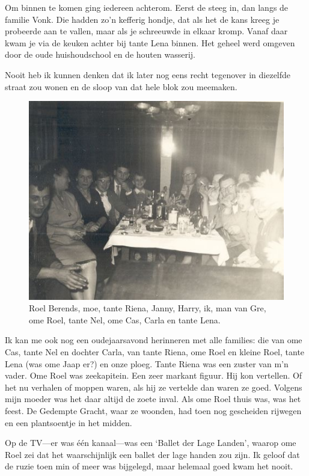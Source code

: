 \documentclass[12pt,twoside]{memoir}
\begin{document}
Om binnen te komen ging iedereen achterom. Eerst de steeg in, dan langs de familie Vonk. Die hadden zo’n kefferig hondje, dat als het de kans kreeg je probeerde aan te vallen, maar als je schreeuwde in elkaar kromp. Vanaf daar kwam je via de keuken achter bij tante Lena binnen. Het geheel werd omgeven door de oude huishoudschool en de houten wasserij.  

Nooit heb ik kunnen denken dat ik later nog eens recht tegenover in diezelfde straat zou wonen en de sloop van dat hele blok zou meemaken.

\begin{figure}[h]
\includegraphics[width=\textwidth]{img/ch1-afb03}
\caption{Roel Berends, moe, tante Riena, Janny, Harry, ik, man van Gre, ome Roel, tante Nel, ome Cas, Carla en tante Lena.}
\end{figure}

Ik kan me ook nog een oudejaarsavond herinneren met alle families: die van ome Cas, tante Nel en dochter Carla, van tante Riena, ome Roel en kleine Roel, tante Lena (was ome Jaap er?) en onze ploeg. Tante Riena was een zuster van m’n vader. Ome Roel was zeekapitein. Een zeer markant figuur. Hij kon vertellen. Of het nu verhalen of moppen waren, als hij ze vertelde dan waren ze goed. Volgens mijn moeder was het daar altijd de zoete inval. Als ome Roel thuis was, was het feest. De Gedempte Gracht, waar ze woonden, had toen nog gescheiden rijwegen en een plantsoentje in het midden. 

Op de TV---er was één kanaal---was een `Ballet der Lage Landen', waarop ome Roel zei dat het waarschijnlijk een ballet der lage handen zou zijn. Ik geloof dat de ruzie toen min of meer was bijgelegd, maar helemaal goed kwam het nooit.  
\end{document}
